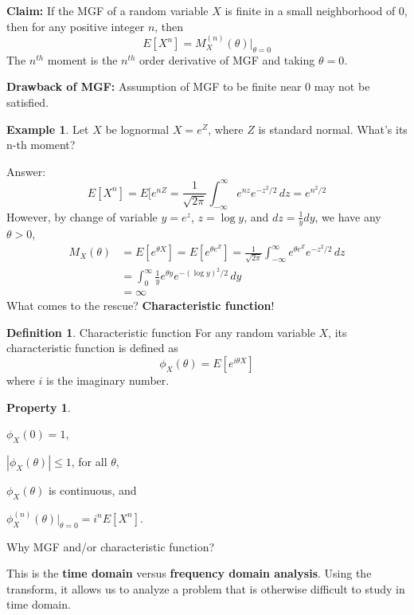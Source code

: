 \documentclass[11pt]{article}
\newenvironment{answer}{\par\begingroup\color{gre}Answer: }{\endgroup}
\theoremstyle{definition}
\newtheorem{definition}{Definition}[section]
\newtheorem{example}{Example}[subsection]
\newtheorem{property}{Property}[definition]
\theoremstyle{remark}
\begin{document}
    \textbf{Claim: }If the MGF of a random variable $X$ is finite in a small neighborhood of 0, then for any positive integer $n$, then 
    $$E[X^n] = M_X^{(n)}(\theta)|_{\theta =0}$$
    The $n^{th}$ moment is the $n^{th}$ order derivative of MGF and taking $\theta = 0$.

    \textbf{Drawback of MGF: } Assumption of MGF to be finite near 0 may not be satisfied.
    \begin{example}
        Let $X$ be lognormal $X = e^Z$, where $Z$ is standard normal. What’s its n-th moment?
    \end{example}
    \begin{answer}
        $$E[X^n] = E[e^{nZ} = \frac{1}{\sqrt{2\pi}}\int_{-\infty}^\infty e^{nz}e^{-z^2/2} \,dz = e^{n^2/2}$$
        However, by change of variable $y=e^z$, $z = \log y$, and $dz = \frac{1}{y}dy$, we have any $\theta >0$,
        \begin{align*}
            M_X(\theta) &= E[e^{\theta X}] =  E[e^{\theta e^Z}] =\frac{1}{\sqrt{2\pi}} \int_{-\infty}^\infty e^{\theta e^Z} e^{-z^2/2} \,dz \\
            &=\int_0^\infty \frac{1}{y}e^{\theta y} e^{-(\log y)^2/2} \,dy \\
            &= \infty
        \end{align*}
    \end{answer}
    What comes to the rescue? \textbf{Characteristic function}!
    \begin{definition}{Characteristic function}
    For any random variable $X$, its characteristic function is defined as 
    $$\phi_X(\theta) = E[e^{i \theta X}]$$
    where $i$ is the imaginary number.
    \begin{property}
        \begin{inlist}[(i)]
            \item $\phi_X(0) = 1$,
            \item $|\phi_X(\theta)| \leq 1$, for all $\theta$,
            \item $\phi_X(\theta)$ is continuous, and 
            \item $\phi_X^{(n)}(\theta)|_{\theta=0} = i^n E[X^n]$.
        \end{inlist}
    \end{property}
    \end{definition}
    
    Why MGF and/or characteristic function? 
    
    This is the \textbf{time domain} versus \textbf{frequency domain analysis}. Using the transform, it allows us to analyze a problem that is otherwise difficult to study in time domain.
    
\end{document}
